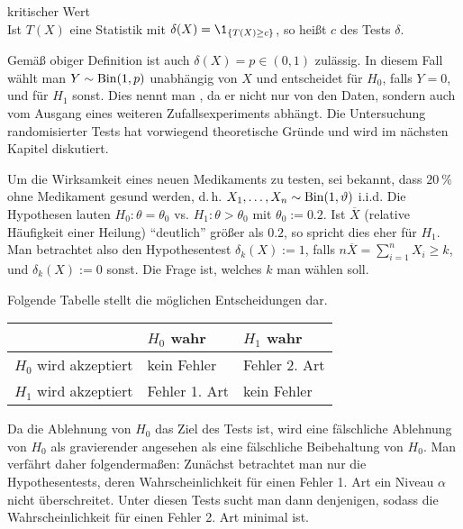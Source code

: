\begin{Def}{kritischer Wert}\\
    Ist $T(X)$ eine Statistik mit $\delta(X) = \1_{\{T(X) \ge c\}}$, so heißt
    $c$  des Tests $\delta$.
\end{Def}

\begin{Bem}
    Gemäß obiger Definition ist auch $\delta(X) = p \in (0, 1)$ zulässig.
    In diesem Fall wählt man $Y \sim \operatorname{Bin}(1, p)$ unabhängig von $X$ und entscheidet
    für $H_0$, falls $Y = 0$, und für $H_1$ sonst.
    Dies nennt man , da er nicht nur von den Daten,
    sondern auch vom Ausgang eines weiteren Zufallsexperiments abhängt.
    Die Untersuchung randomisierter Tests hat vorwiegend theoretische Gründe und wird im
    nächsten Kapitel diskutiert.
\end{Bem}

\begin{Bsp}
    Um die Wirksamkeit eines neuen Medikaments zu testen, sei bekannt,
    dass $\SI{20}{\percent}$ ohne Medikament gesund werden,
    d.\,h. $X_1, \dotsc, X_n \sim \operatorname{Bin}(1, \vartheta)$ i.i.d.
    Die Hypothesen lauten $H_0\colon \theta = \theta_0$ vs.
    $H_1\colon \theta > \theta_0$ mit $\theta_0 := \num{0.2}$.
    Ist $\overline{X}$
    (relative Häufigkeit einer Heilung) "`deutlich"' größer als $\num{0.2}$,
    so spricht dies eher für $H_1$.
    Man betrachtet also den Hypothesentest
    $\delta_k(X) := 1$, falls $n\overline{X} = \sum_{i=1}^n X_i \ge k$, und
    $\delta_k(X) := 0$ sonst.
    Die Frage ist, welches $k$ man wählen soll.
\end{Bsp}

\begin{Bem}
    Folgende Tabelle stellt die möglichen Entscheidungen dar.
    
    \begin{tabular}{p{40mm}p{30mm}p{30mm}}
        \toprule
        & $H_0$ wahr & $H_1$ wahr\\
        \midrule
        $H_0$ wird akzeptiert & kein Fehler & Fehler 2. Art\\
        $H_1$ wird akzeptiert & Fehler 1. Art & kein Fehler\\
        \bottomrule
    \end{tabular}
    
    Da die Ablehnung von $H_0$ das Ziel des Tests ist, wird eine fälschliche Ablehnung von
    $H_0$ als gravierender angesehen als eine fälschliche Beibehaltung von $H_0$.
    Man verfährt daher folgendermaßen:
    Zunächst betrachtet man nur die Hypothesentests,
    deren Wahrscheinlichkeit für einen Fehler 1. Art ein Niveau $\alpha$ nicht überschreitet.
    Unter diesen Tests sucht man dann denjenigen, sodass die Wahrscheinlichkeit für einen
    Fehler 2. Art minimal ist.
\end{Bem}

